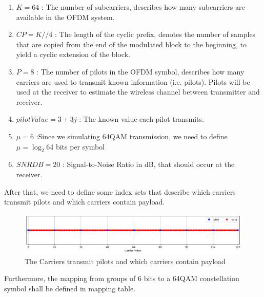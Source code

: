 \begin{enumerate}
    \item $K = 64$ : The number of subcarriers, describes how many subcarriers are available in the OFDM system.
    \item $CP = K//$4 : The length of the cyclic prefix, denotes the number of samples that are copied from the end of the modulated block to the beginning, to yield a cyclic extension of the block.
    \item $P = 8$ : The number of pilots in the OFDM symbol, describes how many carriers are used to transmit known information (i.e. pilots). Pilots will be used at the receiver to estimate the wireless channel between transmitter and receiver.
    \item $pilotValue = 3+3j$ : The known value each pilot transmits.
    \item $\mu = 6$ :Since we simulating 64QAM transmission, we need to define $\mu = \log_{2} 64$ bits per symbol
    \item $SNRDB = 20$ : Signal-to-Noise Ratio in dB, that should occur at the receiver.
\end{enumerate}

After that, we need to define some index sets that describe which carriers transmit pilots and which carriers contain payload.

\begin{figure}[htbp]
    \centering
    \includegraphics[width=\linewidth]{../Source/results/carrier_index}
    \caption{The Carriers transmit pilots and which carriers contain payload}
    \label{carrier_index}
\end{figure}

Furthermore, the mapping from groups of 6 bits to a 64QAM constellation symbol shall be defined in mapping table.

